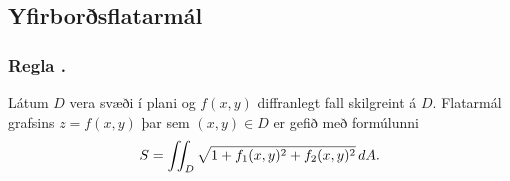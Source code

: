 \subsection{Yfirborðsflatarmál} 

\subsubsection{Regla \kaflanr.}
 Látum $D$ vera svæði í plani og $f(x,y)$ diffranlegt fall skilgreint á $D$.  Flatarmál grafsins $z=f(x,y)$ þar sem $(x,y)\in D$ er gefið með formúlunni
$$S=\int\!\!\!\int_D \sqrt{1+f_1(x,y)^2+f_2(x,y)^2}\,dA.$$






